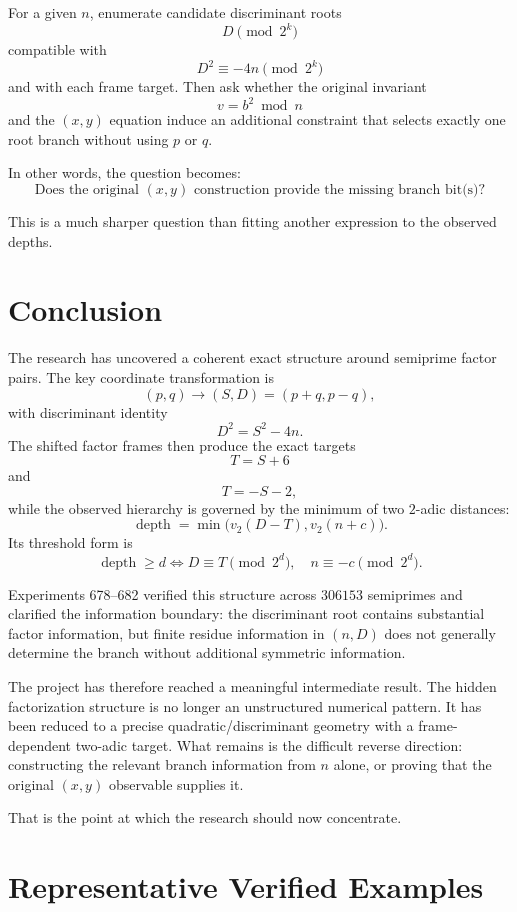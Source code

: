 \documentclass[11pt,a4paper]{article}
\begin{document}
For a given $n$, enumerate candidate discriminant roots
\[
 D\pmod{2^k}
\]
compatible with
\[
 D^2\equiv -4n\pmod{2^k}
\]
and with each frame target.  Then ask whether the original invariant
\[
 v=b^2\bmod n
\]
and the $(x,y)$ equation induce an additional constraint that selects exactly one root branch without using $p$ or $q$.

In other words, the question becomes:
\begin{equation}
\boxed{
\text{Does the original $(x,y)$ construction provide the missing branch bit(s)?}
}
\end{equation}

This is a much sharper question than fitting another expression to the observed depths.

\section{Conclusion}

The research has uncovered a coherent exact structure around semiprime factor pairs.
The key coordinate transformation is
\[
(p,q)\longrightarrow(S,D)=(p+q,p-q),
\]
with discriminant identity
\[
D^2=S^2-4n.
\]
The shifted factor frames then produce the exact targets
\[
T=S+6
\]
and
\[
T=-S-2,
\]
while the observed hierarchy is governed by the minimum of two $2$-adic distances:
\[
\boxed{
\operatorname{depth}
=\min\!\bigl(v_2(D-T),v_2(n+c)\bigr).
}
\]
Its threshold form is
\[
\boxed{
\operatorname{depth}\ge d
\iff
D\equiv T\pmod{2^d},
\quad
n\equiv-c\pmod{2^d}.
}
\]

Experiments 678--682 verified this structure across $306153$ semiprimes and clarified the information boundary: the discriminant root contains substantial factor information, but finite residue information in $(n,D)$ does not generally determine the branch without additional symmetric information.

The project has therefore reached a meaningful intermediate result.  The hidden factorization structure is no longer an unstructured numerical pattern.  It has been reduced to a precise quadratic/discriminant geometry with a frame-dependent two-adic target.  What remains is the difficult reverse direction: constructing the relevant branch information from $n$ alone, or proving that the original $(x,y)$ observable supplies it.

That is the point at which the research should now concentrate.

\appendix

\section{Representative Verified Examples}
\end{document}
